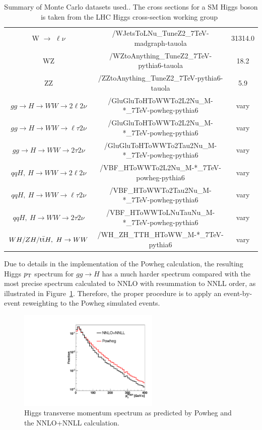 \begin{table}[!ht]
\begin{center}
{\begin{tabular}{|c|c|c|}
W $\rightarrow$ $\ell\nu$           	 &   /WJetsToLNu\_TuneZ2\_7TeV-madgraph-tauola                         &  31314.0 \\
WZ                               	 &   /WZtoAnything\_TuneZ2\_7TeV-pythia6-tauola                        &  18.2 \\
ZZ                               	 &   /ZZtoAnything\_TuneZ2\_7TeV-pythia6-tauola                        &   5.9\\
$gg \to H \to WW \to 2\ell2\nu$          &   /GluGluToHToWWTo2L2Nu\_M-*\_7TeV-powheg-pythia6                   & vary \\
$gg \to H \to WW \to \ell\tau2\nu$       &   /GluGluToHToWWTo2L2Nu\_M-*\_7TeV-powheg-pythia6                   & vary \\
$gg \to H \to WW \to 2\tau2\nu$          &   /GluGluToHToWWTo2Tau2Nu\_M-*\_7TeV-powheg-pythia6                 & vary \\
$qqH,~H \to WW \to 2\ell2\nu$            &   /VBF\_HToWWTo2L2Nu\_M-*\_7TeV-powheg-pythia6                      & vary \\
$qqH,~ H \to WW \to \ell\tau2\nu$	 &   /VBF\_HToWWTo2Tau2Nu\_M-*\_7TeV-powheg-pythia6                    & vary \\
$qqH,~H \to WW \to 2\tau2\nu$	         &   /VBF\_HToWWToLNuTauNu\_M-*\_7TeV-powheg-pythia6                   & vary \\
$WH/ZH/\mathrm{t}\bar{\mathrm{t}} H,~H\to WW$                &   /WH\_ZH\_TTH\_HToWW\_M-*\_7TeV-pythia6                            & vary \\
\hline
\hline
\end{tabular}
}
\caption{Summary of Monte Carlo datasets used.\label{tab:DatasetsMC}. The cross sections for a SM Higgs boson
is taken from the LHC Higgs cross-section working group~\cite{LHCHiggsCrossSectionWorkingGroup:2011ti}}
\end{center}
\end{table}

Due to details in the implementation of the Powheg calculation, the
resulting Higgs $p_\mathrm{T}$ spectrum for $gg \to H$ has a much harder
spectrum compared with the most precise spectrum calculated to NNLO
with resummation to NNLL order, as illustrated in
Figure~\ref{fig:h160ww_pthiggs}. Therefore, the proper procedure is
to apply an event-by-event reweighting to the Powheg simulated
events.

\begin{figure}[!htbp]
\begin{center}
   \includegraphics[width=0.60\textwidth]{figures/h160ww_pthiggs.pdf}
\caption{Higgs transverse momentum spectrum as predicted by Powheg and the NNLO+NNLL calculation.}
\label{fig:h160ww_pthiggs}
\end{center}
\end{figure}
